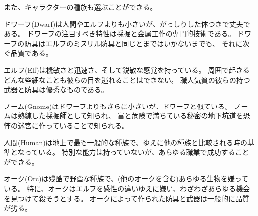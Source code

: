 また、キャラクターの種族も選ぶことができる。

\blist{}
\item[\bb{Dwarves}]%
ドワーフ(Dwarf)は人間やエルフよりも小さいが、がっしりした体つきで丈夫である。
ドワーフの注目すべき特性は採掘と金属工作の専門的技術である。
ドワーフの防具はエルフのミスリル防具と同じとまではいかないまでも、
それに次ぐ品質である。
\item[\bb{Elves}]%
エルフ(Elf)は機敏さと迅速さ、そして鋭敏な感覚を持っている。
周囲で起きるどんな些細なことも彼らの目を逃れることはできない。
職人気質の彼らの持つ武器と防具は優秀なものである。
\item[\bb{Gnomes}]%
ノーム(Gnome)はドワーフよりもさらに小さいが、ドワーフと似ている。
ノームは熟練した採掘師として知られ、
富と危険で満ちている秘密の地下坑道を恐怖の迷宮に作っていることで知られる。
\item[\bb{Humans}]%
人間(Human)は地上で最も一般的な種族で、ゆえに他の種族と比較される時の基準となっている。
特別な能力は持っていないが、あらゆる職業で成功することができる。
\item[\bb{Orcs}]%
オーク(Orc)は残酷で野蛮な種族で、(他のオークを含む)あらゆる生物を嫌っている。
特に、オークはエルフを感性の違いゆえに嫌い、わざわざあらゆる機会を見つけて殺そうとする。
オークによって作られた防具と武器は一般的に品質が劣る。
\elist


